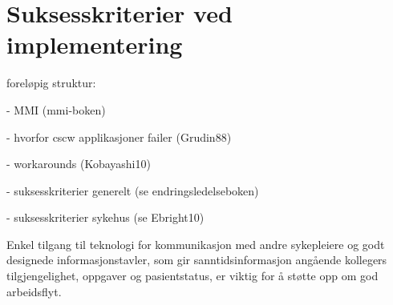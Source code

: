 \section{Suksesskriterier ved implementering}
\label{chp: suksesskriterier}

foreløpig struktur:


- MMI (mmi-boken)

- hvorfor cscw applikasjoner failer (Grudin88)

- workarounds (Kobayashi10)

- suksesskriterier generelt (se endringsledelseboken)

- suksesskriterier sykehus (se Ebright10)

\noindent


\noindent
Enkel tilgang til teknologi for kommunikasjon med andre sykepleiere og godt designede informasjonstavler, som gir sanntidsinformasjon angående kollegers tilgjengelighet, oppgaver og pasientstatus, er viktig for å støtte opp om god arbeidsflyt\cite{Ebright10}.
